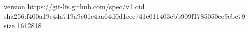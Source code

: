 version https://git-lfs.github.com/spec/v1
oid sha256:f400a19c44a719a9c01c4aa64d0d1cee741c011403cbb909f1785050ee9cbc79
size 1612818
